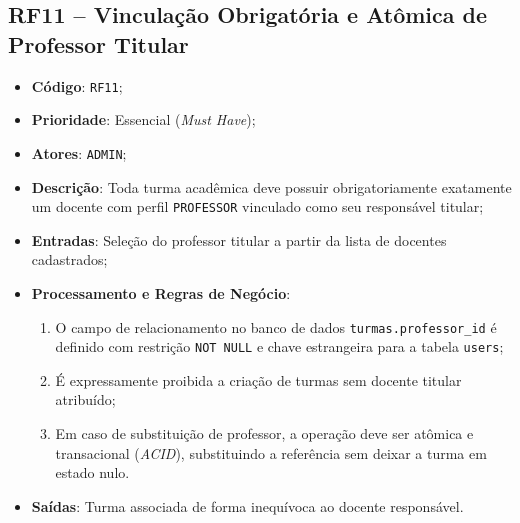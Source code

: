 \subsection{RF11 -- Vinculação Obrigatória e Atômica de Professor Titular}
\begin{itemize}
    \item \textbf{Código}: \texttt{RF11};
    \item \textbf{Prioridade}: Essencial (\textit{Must Have});
    \item \textbf{Atores}: \texttt{ADMIN};
    \item \textbf{Descrição}: Toda turma acadêmica deve possuir obrigatoriamente exatamente um docente com perfil \texttt{PROFESSOR} vinculado como seu responsável titular;
    \item \textbf{Entradas}: Seleção do professor titular a partir da lista de docentes cadastrados;
    \item \textbf{Processamento e Regras de Negócio}:
    \begin{enumerate}
        \item O campo de relacionamento no banco de dados \texttt{turmas.professor\_id} é definido com restrição \texttt{NOT NULL} e chave estrangeira para a tabela \texttt{users};
        \item É expressamente proibida a criação de turmas sem docente titular atribuído;
        \item Em caso de substituição de professor, a operação deve ser atômica e transacional (\textit{ACID}), substituindo a referência sem deixar a turma em estado nulo.
    \end{enumerate}
    \item \textbf{Saídas}: Turma associada de forma inequívoca ao docente responsável.
\end{itemize}

